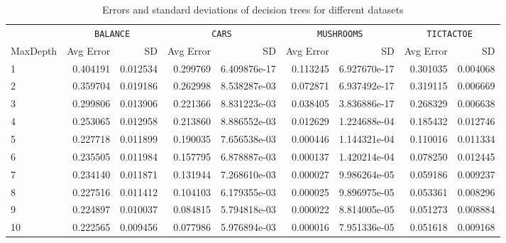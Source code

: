 \documentclass[screen, authorversion, nonacm, sigconf]{acmart}
\begin{document}
\begin{table}
  \centering
  \begin{tabular}{lrrrrrrrr}
    \toprule
    {} & \multicolumn{2}{c}{\texttt{BALANCE}} & \multicolumn{2}{c}{\texttt{CARS}} & \multicolumn{2}{c}{\texttt{MUSHROOMS}} & \multicolumn{2}{c}{\texttt{TICTACTOE}} \\
    \cmidrule(r){2-3} \cmidrule(lr){4-5} \cmidrule(lr){6-7} \cmidrule(l){8-9} 
    MaxDepth &     Avg Error & SD &     Avg Error & SD &     Avg Error & SD &     Avg Error & SD \\
    \midrule
    1        &  0.404191 &           0.012534 &  0.299769 &       6.409876e-17 &  0.113245 &       6.927670e-17 &  0.301035 &           0.004068 \\
    2        &  0.359704 &           0.019186 &  0.262998 &       8.538287e-03 &  0.072871 &       6.937492e-17 &  0.319115 &           0.006669 \\
    3        &  0.299806 &           0.013906 &  0.221366 &       8.831223e-03 &  0.038405 &       3.836886e-17 &  0.268329 &           0.006638 \\
    4        &  0.253065 &           0.012958 &  0.213860 &       8.886552e-03 &  0.012629 &       1.224688e-04 &  0.185432 &           0.012746 \\
    5        &  0.227718 &           0.011899 &  0.190035 &       7.656538e-03 &  0.000446 &       1.144321e-04 &  0.110016 &           0.011334 \\
    6        &  0.235505 &           0.011984 &  0.157795 &       6.878887e-03 &  0.000137 &       1.420214e-04 &  0.078250 &           0.012445 \\
    7        &  0.234140 &           0.011871 &  0.131944 &       7.268610e-03 &  0.000027 &       9.986264e-05 &  0.059186 &           0.009237 \\
    8        &  0.227516 &           0.011412 &  0.104103 &       6.179355e-03 &  0.000025 &       9.896975e-05 &  0.053361 &           0.008296 \\
    9        &  0.224897 &           0.010037 &  0.084815 &       5.794818e-03 &  0.000022 &       8.814005e-05 &  0.051273 &           0.008884 \\
    10       &  0.222565 &           0.009456 &  0.077986 &       5.976894e-03 &  0.000016 &       7.951336e-05 &  0.051618 &           0.009168 \\
    \bottomrule
  \end{tabular}
  \caption{Errors and standard deviations of decision trees for different datasets}
  \label{tab:errs}
\end{table}
\end{document}
